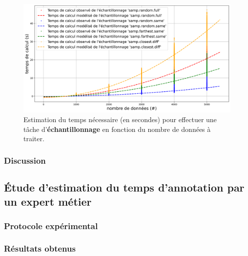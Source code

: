			\begin{figure}[H]
				\centering
				\includegraphics[width=\textwidth]{figures/etude-temps-calcul-modelisation-4samp}
				\caption{Estimation du temps nécessaire (en secondes) pour effectuer une tâche d'\textbf{échantillonnage} en fonction du nombre de données à traiter.}
				\label{figure:4.3.1-ETUDE-COUTS-TEMPS-CALCUL-MODELISATION-SAMPLING}
			\end{figure}
			

		\subsubsection{Discussion}
		
	
	\subsection{Étude d'estimation du temps d'annotation par un expert métier}
	\label{section:4.3.2-HYPOTHESE-COUTS-TEMPS-ANNOTATION}
	
		\subsubsection{Protocole expérimental}
		
										

		\subsubsection{Résultats obtenus}
		
